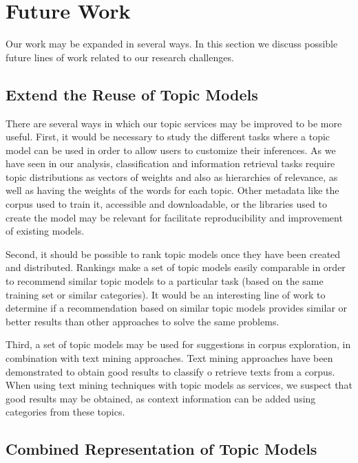 
\section{Future Work}

Our work may be expanded in several ways. In this section we discuss possible future lines of work related to our research challenges.

\subsection{Extend the Reuse of Topic Models}

There are several ways in which our topic services may be improved to be more useful. First, it would be necessary to study the different tasks where a topic model can be used in order to allow users to customize their inferences. As we have seen in our analysis, classification and information retrieval tasks require topic distributions as vectors of weights and also as hierarchies of relevance, as well as having the weights of the words for each topic. Other metadata like the corpus used to train it, accessible and downloadable, or the libraries used to create the model may be relevant for facilitate reproducibility and improvement of existing models.

Second, it should be possible to rank topic models once they have been created and distributed. Rankings make a set of topic models easily comparable in order to recommend similar topic models to a particular task (based on the same training set or similar categories). It would be an interesting line of work to determine if a recommendation based on similar topic models provides similar or better results than other approaches to solve the same problems.

Third, a set of topic models may be used for suggestions in corpus exploration, in combination with text mining approaches. Text mining approaches have been demonstrated to obtain good results to classify o retrieve texts from a corpus. When using text mining techniques with topic models as services, we suspect that good results may be obtained, as context information can be added using categories from these topics. 


\subsection{Combined Representation of Topic Models}

